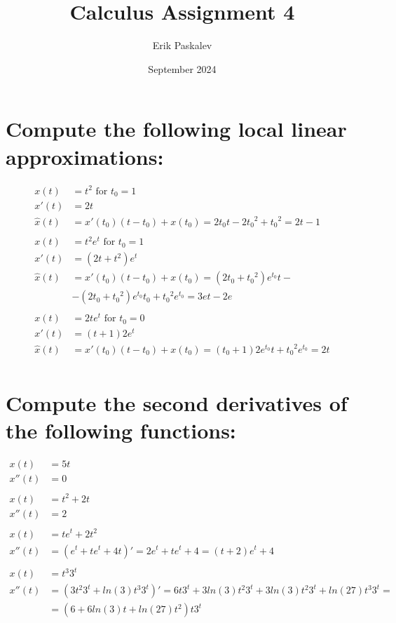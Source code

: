 \documentclass{article}
\title{Calculus Assignment 4}
\author{Erik Paskalev}
\date{September 2024}
\begin{document}
\maketitle

\section{\normalfont Compute the following local linear approximations:}

\begin{equation}
\begin{split}
x(t) & = t^2 \text{ for } t_0 = 1 \\
x'(t) & = 2t \\
\widehat{x}(t) & = x'(t_0)(t-t_0) + x(t_0) = 2t_0t - 2{t_0}^2 + {t_0}^2 = 2t - 1 \\ 
\\
x(t) & = t^2e^t \text{ for } t_0 = 1 \\
x'(t) & = (2t+t^2)e^t \\
\widehat{x}(t) & = x'(t_0)(t-t_0) + x(t_0) = (2t_0 + {t_0}^2)e^{t_0} t - \\ 
& - (2t_0 + {t_0}^2)e^{t_0} t_0 + {t_0}^2e^{t_0} = 3et - 2e \\
\\
x(t) & = 2te^t \text{ for } t_0 = 0 \\
x'(t) & = (t+1)2e^t \\
\widehat{x}(t) & = x'(t_0)(t-t_0) + x(t_0) = (t_0+ 1)2e^{t_0} t +{t_0}^2e^{t_0} = 2t\\
\end{split}
\end{equation}


\section{\normalfont Compute the second derivatives of the following functions:}

\begin{equation}
\begin{split}
x(t) & = 5t \\
x''(t) & = 0 \\ \\
x(t) & = t^2 + 2t \\
x''(t) & = 2 \\ \\
x(t) & = te^t + 2t^2 \\
x''(t) & = (e^t + te^t + 4t)' = 2e^t + te^t + 4 = (t+2)e^t + 4 \\ \\
x(t) & = t^3 3^t \\
x''(t) & = (3t^2 3^t + ln(3)t^3 3^t)' = 6t 3^t + 3ln(3)t^2 3^t + 3ln(3)t^2 3^t + ln(27)t^3 3^t = \\ 
& = (6 + 6ln(3)t + ln(27)t^2)t 3^t
\end{split}
\end{equation}
\end{document}

